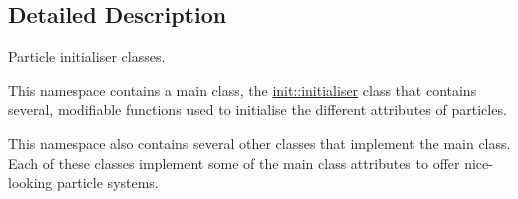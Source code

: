 \subsection{Detailed Description}
Particle initialiser classes. 

This namespace contains a \textquotesingle{}main\textquotesingle{} class, the \hyperlink{classphysim_1_1init_1_1initialiser}{init\+::initialiser} class that contains several, modifiable functions used to initialise the different attributes of particles.

This namespace also contains several other classes that implement the \textquotesingle{}main\textquotesingle{} class. Each of these classes implement some of the \textquotesingle{}main\textquotesingle{} class attributes to offer nice-\/looking particle systems. 